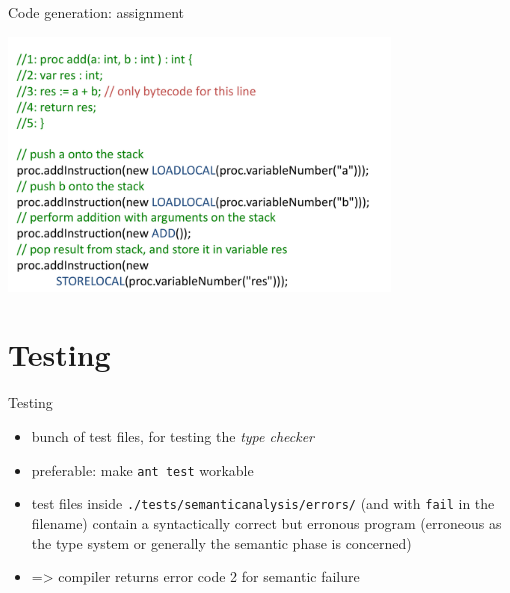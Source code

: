 \documentclass{beamer}
\begin{document}
\begin{frame}[label={sec:orgadebd05}]{Code generation: assignment}
\begin{center}
 \includegraphics[width=0.76\textwidth]{figures/snaps/codegen-assignment}
\end{center}
\end{frame}
\section{Testing}
\label{sec:org989d9c6}
\begin{frame}[label={sec:org9dc995a},fragile]{Testing}
 \begin{itemize}
\item bunch of test files, for testing the \emph{type checker}
\item preferable: make \texttt{ant test} workable

\item test files inside \texttt{./tests/semanticanalysis/errors/} (and with \texttt{fail} in
the filename) contain a syntactically correct but erronous program
(erroneous as the type system or generally the semantic phase is
concerned)

\item => compiler returns error code 2 for semantic failure
\end{itemize}
\end{frame}
\end{document}
